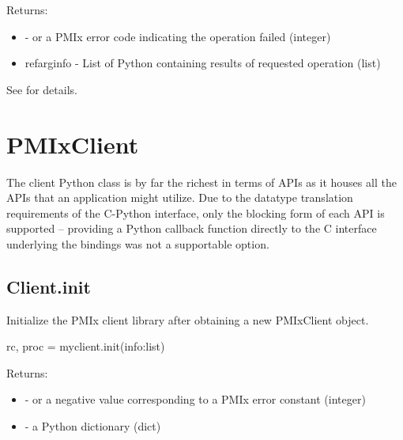 Returns:
\begin{itemize}
    \item {} -  or a \ac{PMIx} error code indicating the operation failed (integer)
    \item refarg{info} - List of Python  containing results of requested operation (list)
\end{itemize}

See  for details.


\section{PMIxClient}
\label{app:python:client}

The client Python class is by far the richest in terms of \acp{API} as it houses all the \acp{API} that an application might utilize. Due to the datatype translation requirements of the C-Python interface, only the blocking form of each \ac{API} is supported – providing a Python callback function directly to the C interface underlying the bindings was not a supportable option.


\subsection{Client.init}

\summary Initialize the \ac{PMIx} client library after obtaining a new PMIxClient object.

\format

\pyspecificstart
\begin{codepar}
rc, proc = myclient.init(info:list)
\end{codepar}
\pyspecificend


\begin{arglist}
\end{arglist}

Returns:

\begin{itemize}
    \item {} -  or a negative value corresponding to a PMIx error constant (integer)
    \item {} - a Python  dictionary (dict)
\end{itemize}



